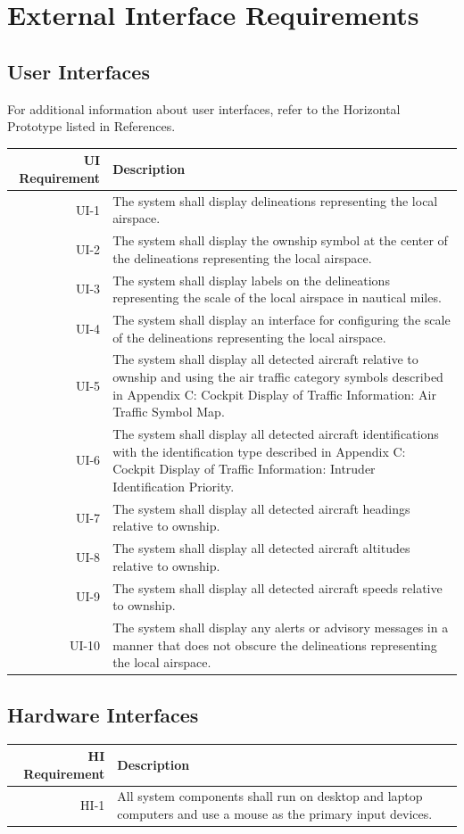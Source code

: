 \documentclass[12pt,oneside,letterpaper]{article}
\begin{document}
\section{External Interface Requirements}

\subsection{User Interfaces}
For additional information about user interfaces, refer to the Horizontal Prototype listed in References.
\begin{longtable}{|r|p{3.8in}|}
\hline
UI Requirement & Description \\
\hline
UI-1 & The system shall display delineations representing the local airspace. \\
\hline
UI-2 & The system shall display the ownship symbol at the center of the delineations representing the local airspace. \\
\hline
UI-3 & The system shall display labels on the delineations representing the scale of the local airspace in nautical miles. \\
\hline
UI-4 & The system shall display an interface for configuring the scale of the delineations representing the local airspace. \\
\hline
UI-5 & The system shall display all detected aircraft relative to ownship and using the air traffic category symbols described in Appendix C: Cockpit Display of Traffic Information: Air Traffic Symbol Map. \\
\hline
UI-6 & The system shall display all detected aircraft identifications with the identification type described in Appendix C: Cockpit Display of Traffic Information: Intruder Identification Priority. \\
\hline
UI-7 & The system shall display all detected aircraft headings relative to ownship. \\
\hline
UI-8 & The system shall display all detected aircraft altitudes relative to ownship. \\
\hline
UI-9 & The system shall display all detected aircraft speeds relative to ownship. \\
\hline
UI-10 & The system shall display any alerts or advisory messages in a manner that does not obscure the delineations representing the local airspace. \\
\hline
\end{longtable}

\subsection{Hardware Interfaces}
\begin{longtable}{|r|p{3.8in}|}
\hline
HI Requirement & Description \\
\hline
HI-1 & All system components shall run on desktop and laptop computers and use a mouse as the primary input devices. \\
\hline
\end{longtable}
\end{document}
